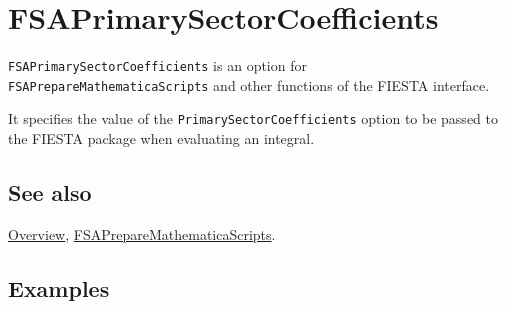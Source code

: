 \documentclass[../FeynHelpersManual.tex]{subfiles}
\begin{document}
\begin{Shaded}
\begin{Highlighting}[]
 
\end{Highlighting}
\end{Shaded}

\hypertarget{fsaprimarysectorcoefficients}{
\section{FSAPrimarySectorCoefficients}\label{fsaprimarysectorcoefficients}}

\texttt{FSAPrimarySectorCoefficients} is an option for
\texttt{FSAPrepareMathematicaScripts} and other functions of the FIESTA
interface.

It specifies the value of the \texttt{PrimarySectorCoefficients} option
to be passed to the FIESTA package when evaluating an integral.

\subsection{See also}

\hyperlink{toc}{Overview},
\hyperlink{fsapreparemathematicascripts}{FSAPrepareMathematicaScripts}.

\subsection{Examples}
\end{document}
